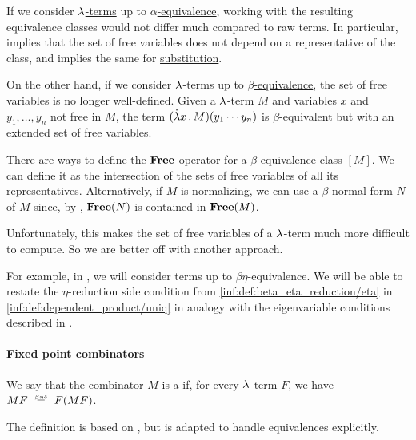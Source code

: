 \begin{remark}\label{rem:beta_equivalence_and_free_variables}
  If we consider \hyperref[def:lambda_term]{\( {\mathrm \lambda} \)-terms} up to \hyperref[def:lambda_term_alpha_equivalence]{\( \alpha \)-equivalence}, working with the resulting equivalence classes would not differ much compared to raw terms. In particular,  implies that the set of free variables does not depend on a representative of the class, and  implies the same for \hyperref[def:lambda_term_substitution]{substitution}.

  On the other hand, if we consider \( {\mathrm \lambda} \)-terms up to \hyperref[def:beta_eta_reduction]{\( \beta \)-equivalence}, the set of free variables is no longer well-defined. Given a \( {\mathrm \lambda} \)-term \( M \) and variables \( x \) and \( y_1, \ldots, y_n \) not free in \( M \), the term \( (\qabs x M) (y_1 \cdots y_n) \) is \( \beta \)-equivalent but with an extended set of free variables.

  There are ways to define the \( \op*{Free} \) operator for a \( \beta \)-equivalence class \( [M] \). We can define it as the intersection of the sets of free variables of all its representatives. Alternatively, if \( M \) is \hyperref[def:lambda_term_normal_form]{normalizing}, we can use a \hyperref[def:lambda_term_normal_form]{\( \beta \)-normal form} \( N \) of \( M \) since, by , \( \op*{Free}(N) \) is contained in \( \op*{Free}(M) \).

  Unfortunately, this makes the set of free variables of a \( {\mathrm \lambda} \)-term much more difficult to compute. So we are better off with another approach.

  For example, in , we will consider terms up to \( \beta\eta \)-equivalence. We will be able to restate the \( \eta \)-reduction side condition from \ref{inf:def:beta_eta_reduction/eta} in \ref{inf:def:dependent_product/uniq} in analogy with the eigenvariable conditions described in .
\end{remark}

\paragraph{Fixed point combinators}

\begin{definition}\label{def:function_fixed_point_combinator}\mimprovised
  We say that the combinator \( M \) is a  if, for every \( {\mathrm \lambda} \)-term \( F \), we have \( MF \equivrel{\beta\eta\delta} F(MF) \).
\end{definition}
\begin{comments}
  \item The definition is based on \cite[\S 6.1.2]{Barendregt1984LambdaCalculus}, but is adapted to handle equivalences explicitly.
\end{comments}

